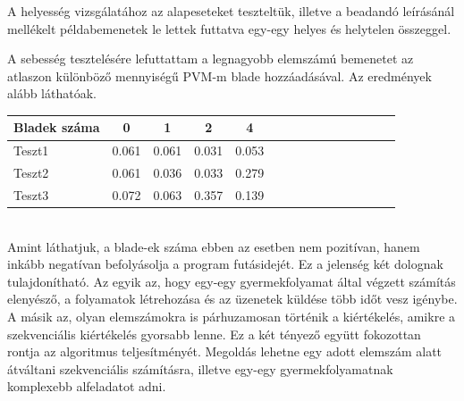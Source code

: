 \documentclass[12pt]{article}
\begin{document}
A helyesség vizsgálatához az alapeseteket teszteltük, illetve a beadandó leírásánál mellékelt
példabemenetek le lettek futtatva egy-egy helyes és helytelen összeggel.

A sebesség tesztelésére lefuttattam a legnagyobb elemszámú bemenetet az atlaszon különböző mennyiségű PVM-m blade
hozzáadásával. Az eredmények alább láthatóak.\\[12px]

	\begin{tabular}{l|*{14}{c}}
		Bladek száma & 0 & 1 & 2 & 4 \\
		\hline
		Teszt1 & 0.061 & 0.061 & 0.031 & 0.053 \\
		\hline
		Teszt2 & 0.061 & 0.036 & 0.033 & 0.279 \\
		\hline
		Teszt3 & 0.072 & 0.063 & 0.357 & 0.139 \\
	\end{tabular}
\\[12px]

Amint láthatjuk, a blade-ek száma ebben az esetben nem pozitívan, hanem inkább negatívan befolyásolja a program futásidejét.
Ez a jelenség két dolognak tulajdonítható. Az egyik az, hogy egy-egy gyermekfolyamat által végzett számítás elenyésző,
a folyamatok létrehozása és az üzenetek küldése több időt vesz igénybe. A másik az, olyan elemszámokra is párhuzamosan
történik a kiértékelés, amikre a szekvenciális kiértékelés gyorsabb lenne. Ez a két tényező együtt fokozottan rontja az
algoritmus teljesítményét. Megoldás lehetne egy adott elemszám alatt átváltani szekvenciális számításra, illetve egy-egy
gyermekfolyamatnak komplexebb alfeladatot adni.
\end{document}
